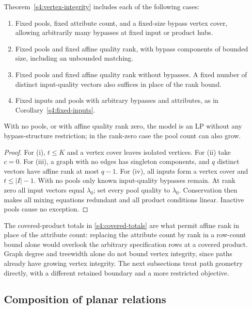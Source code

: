 \begin{corollary}
\label{s4:structural-corollaries}
Theorem~\ref{s4:vertex-integrity} includes each of the following cases:
\begin{enumerate}[label=(\roman*)]
 \item Fixed pools, fixed attribute count, and a fixed-size bypass
 vertex cover, allowing arbitrarily many bypasses at fixed input or
 product hubs.
 \item Fixed pools and fixed affine quality rank, with bypass components
 of bounded size, including an unbounded matching.
 \item Fixed pools and fixed affine quality rank without bypasses.
 A fixed number of distinct input-quality vectors also suffices in
 place of the rank bound.
 \item Fixed inputs and pools with arbitrary bypasses and attributes,
 as in Corollary~\ref{s4:fixed-inputs}.
\end{enumerate}
With no pools, or with affine quality rank zero, the model is an LP
without any bypass-structure restriction; in the rank-zero case the
pool count can also grow.
\end{corollary}
\begin{proof}
For (i), $t\le K$ and a vertex cover leaves isolated vertices. For (ii)
take $c=0$. For (iii), a graph with no edges has singleton components,
and $q$ distinct vectors have affine rank at most $q-1$. For (iv), all
inputs form a vertex cover and $t\le|I|-1$. With no pools only known
input-quality bypasses remain. At rank zero all input vectors equal
$\lambda_0$; set every pool quality to $\lambda_0$. Conservation then
makes all mixing equations redundant and all product conditions linear.
Inactive pools cause no exception.
\end{proof}

The covered-product totals in \eqref{s4:covered-totals} are what permit
affine rank in place of the attribute count: replacing the attribute
count by rank in a row-count bound alone would overlook the arbitrary
specification rows at a covered product. Graph degree and treewidth
alone do not bound vertex integrity, since paths already have growing
vertex integrity. The next subsections treat path geometry directly,
with a different retained boundary and a more restricted objective.

\subsection{Composition of planar relations}\label{s4:planar}

